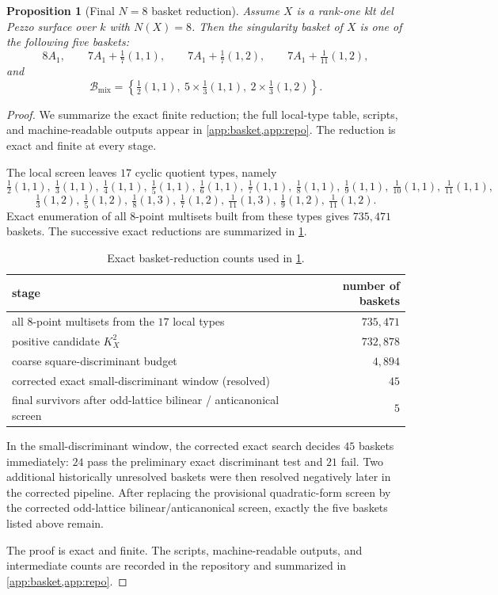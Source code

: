 \documentclass[11pt]{article}
\newtheorem{proposition}[proposition]{Proposition}
\theoremstyle{definition}
\begin{document}
\begin{proposition}[Final $N=8$ basket reduction]\label{prop:final-baskets}
Assume $X$ is a rank-one klt del Pezzo surface over $k$ with $N(X)=8$. Then the singularity basket of $X$ is one of the following five baskets:
\[
8A_1,
\qquad
7A_1+\tfrac17(1,1),
\qquad
7A_1+\tfrac17(1,2),
\qquad
7A_1+\tfrac1{11}(1,2),
\]
and
\[
\mathcal B_{\mathrm{mix}}=\left\{\tfrac12(1,1),\ 5\times\tfrac13(1,1),\ 2\times\tfrac13(1,2)\right\}.
\]
\end{proposition}

\begin{proof}
We summarize the exact finite reduction; the full local-type table, scripts, and machine-readable outputs appear in \cref{app:basket,app:repo}. The reduction is exact and finite at every stage.

The local screen leaves $17$ cyclic quotient types, namely
\[
\tfrac12(1,1),\ \tfrac13(1,1),\ \tfrac14(1,1),\ \tfrac15(1,1),\ \tfrac16(1,1),\ \tfrac17(1,1),\ \tfrac18(1,1),\ \tfrac19(1,1),\ \tfrac1{10}(1,1),\ \tfrac1{11}(1,1),
\]
\[
\tfrac13(1,2),\ \tfrac15(1,2),\ \tfrac18(1,3),\ \tfrac17(1,2),\ \tfrac1{11}(1,3),\ \tfrac19(1,2),\ \tfrac1{11}(1,2).
\]
Exact enumeration of all $8$-point multisets built from these types gives $735{,}471$ baskets. The successive exact reductions are summarized in \cref{tab:basketcounts}.

\begin{table}[h]
\centering
\begin{tabular}{l r}
\toprule
stage & number of baskets \\
\midrule
all $8$-point multisets from the $17$ local types & $735{,}471$ \\
positive candidate $K_X^2$ & $732{,}878$ \\
coarse square-discriminant budget & $4{,}894$ \\
corrected exact small-discriminant window (resolved) & $45$ \\
final survivors after odd-lattice bilinear / anticanonical screen & $5$ \\
\bottomrule
\end{tabular}
\caption{Exact basket-reduction counts used in \cref{prop:final-baskets}.}
\label{tab:basketcounts}
\end{table}

In the small-discriminant window, the corrected exact search decides $45$ baskets immediately: $24$ pass the preliminary exact discriminant test and $21$ fail. Two additional historically unresolved baskets were then resolved negatively later in the corrected pipeline. After replacing the provisional quadratic-form screen by the corrected odd-lattice bilinear/anticanonical screen, exactly the five baskets listed above remain.

The proof is exact and finite. The scripts, machine-readable outputs, and intermediate counts are recorded in the repository and summarized in \cref{app:basket,app:repo}.
\end{proof}
\end{document}
